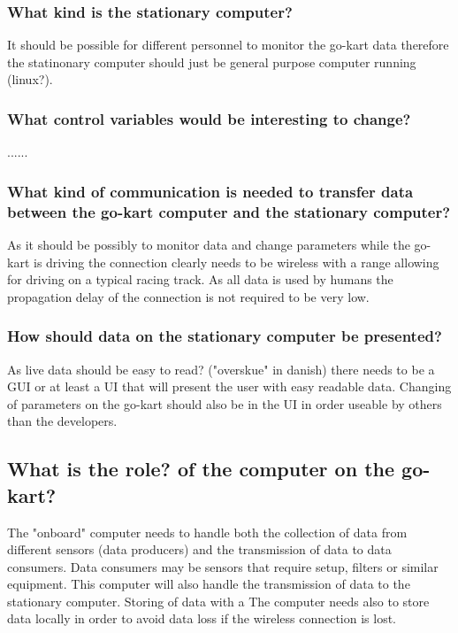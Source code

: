 \subsubsection*{What kind is the stationary computer?}
It should be possible for different personnel to monitor the go-kart data therefore the statinonary computer should just be general purpose computer running (linux?).


\subsubsection*{What control variables would be interesting to change?}
......

\subsubsection*{What kind of communication is needed to transfer data between the go-kart computer and the stationary computer?}
As it should be possibly to monitor data and change parameters while the go-kart is driving the connection clearly needs to be wireless with a range allowing for driving on a typical racing track. 
As all data is used by humans the propagation delay of the connection is not required to be very low.

\subsubsection*{How should data on the stationary computer be presented?}
As live data should be easy to read? ("overskue" in danish) there needs to be a GUI or at least a UI that will present the user with easy readable data. 
Changing of parameters on the go-kart should also be in the UI in order useable by others than the developers.

\subsection{What is the role? of the computer on the go-kart?}
The "onboard" computer needs to handle both the collection
of data from different sensors (data producers) and the transmission of data to 
data consumers.
Data consumers may be sensors that require setup, filters or similar equipment.
This computer will also handle the transmission of data to the stationary 
computer.
Storing of data with a 
The computer needs also to store data locally in order to avoid data loss if the wireless connection is lost.

